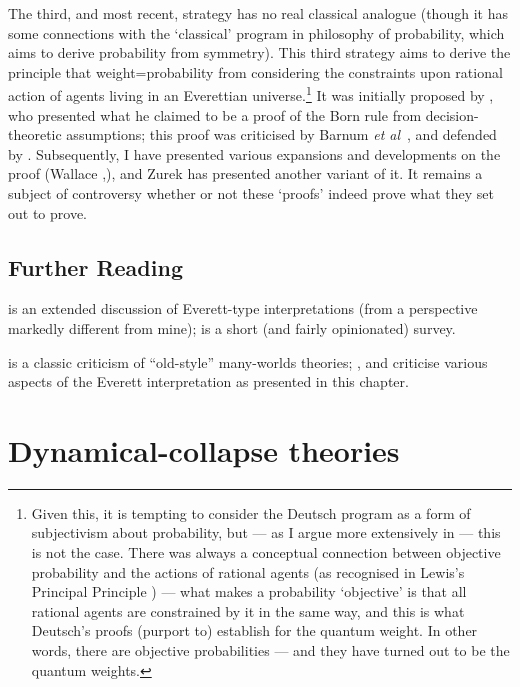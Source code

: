\documentclass[12pt]{article}
\begin{document}
The third, and most recent, strategy has no real classical analogue (though it has some connections with the `classical' program in philosophy of probability, which aims to derive probability from symmetry). This third strategy aims to derive the principle that weight=probability from considering the constraints upon rational action of agents living in an Everettian universe.\footnote{Given this, it is tempting to consider the Deutsch program as a form of subjectivism about probability, but --- as I argue more extensively in  --- this is not the case. There was always a conceptual connection between objective probability and the actions of rational agents (as recognised in Lewis's Principal Principle \cite{lewischance}) --- what makes a probability `objective' is that all rational agents are constrained by it in the same way, and this is what Deutsch's proofs (purport to) establish for the quantum weight. In other words, there are objective probabilities --- and they have turned out to be the quantum weights.} It was initially proposed by , who presented what he claimed to be a proof of the Born rule from decision-theoretic assumptions; this proof was criticised by Barnum \emph{et al}~\citeyear{barnumetal}, and defended by . Subsequently, I have presented various expansions and developments on the proof (Wallace ,), and Zurek \citeyear{zurekenvariance03,zurekenvariance05} has presented another variant of it. It remains a subject of controversy whether or not these `proofs' indeed prove what they set out to prove.



\subsection{Further Reading}

 is an extended discussion of Everett-type interpretations (from a perspective markedly different from mine);  is a short (and fairly opinionated) survey.

 is a classic criticism of ``old-style'' many-worlds theories; ,  and  criticise various aspects of the Everett interpretation as presented in this chapter.

\section{Dynamical-collapse theories}\label{DMWWdynamicalcollapse}
\end{document}
